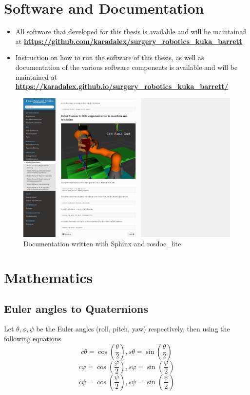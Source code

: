\section{Software and Documentation}

\begin{itemize}
\item All software that developed for this thesis is available and will be maintained at \textbf{\url{https://github.com/karadalex/surgery_robotics_kuka_barrett}}
\item Instruction on how to run the software of this thesis, as well as documentation of the various software components is available and will be maintained at 
	\textbf{\url{https://karadalex.github.io/surgery_robotics_kuka_barrett/}}
\end{itemize}

\begin{center}
\begin{figure}[!htb]
\centering
\includegraphics[width=\textwidth]{images/documentation.png}
\caption{Documentation written with Sphinx and rosdoc\_lite }
\label{documentation}
\end{figure}
\end{center}

\section{Mathematics}

\subsection{Euler angles to Quaternions}

Let $\theta, \phi, \psi$ be the Euler angles (roll, pitch, yaw) respectively, then using the following equations
\[
cθ = \cos\left( \frac{θ}{2} \right) , sθ = \sin\left( \frac{θ}{2} \right)
\]
\[
cφ = \cos\left( \frac{φ}{2} \right) , sφ = \sin\left( \frac{φ}{2} \right)
\]
\[
cψ = \cos\left( \frac{ψ}{2} \right) , sψ = \sin\left( \frac{ψ}{2} \right)
\]

